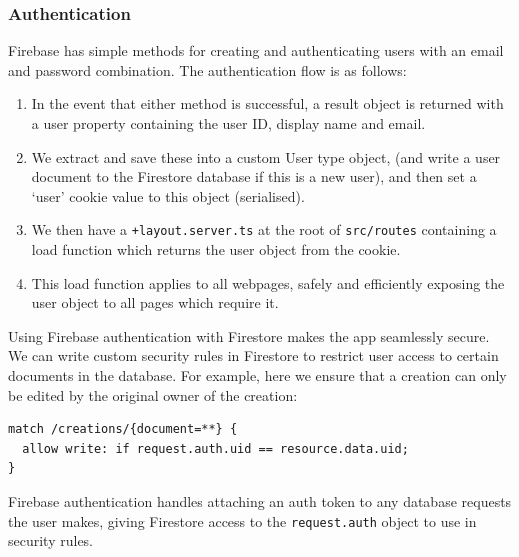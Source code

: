 \documentclass[12pt,a4paper]{article}
\begin{document}
\subsubsection{Authentication}
Firebase has simple methods for creating and authenticating users with an email and password combination. The authentication flow is as follows:
\begin{enumerate}
    \item In the event that either method is successful, a result object is returned with a user property containing the user ID, display name and email.
    \item We extract and save these into a custom User type object, (and write a user document to the Firestore database if this is a new user), and then set a `user' cookie value to this object (serialised).
    \item We then have a \verb|+layout.server.ts| at the root of \verb|src/routes| containing a load function which returns the user object from the cookie.
    \item  This load function applies to all webpages, safely and efficiently exposing the user object to all pages which require it.
\end{enumerate}
Using Firebase authentication with Firestore makes the app seamlessly secure. We can write custom security rules in Firestore to restrict user access to certain documents in the database. For example, here we ensure that a creation can only be edited by the original owner of the creation:
\begin{lstlisting}
match /creations/{document=**} {
  allow write: if request.auth.uid == resource.data.uid;
}
\end{lstlisting}
Firebase authentication handles attaching an auth token to any database requests the user makes, giving Firestore access to the \verb|request.auth| object to use in security rules.
\end{document}

